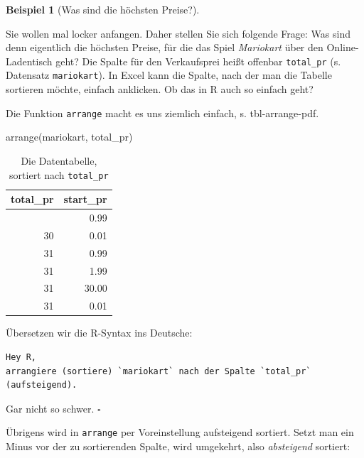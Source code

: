 \documentclass[
  letterpaper,
  twoside,
  open=any]{scrbook}
\newenvironment{Shaded}{\begin{snugshade}}{\end{snugshade}}
\newcommand{\FunctionTok}[1]{\textcolor[rgb]{0.28,0.35,0.67}{#1}}
\newcommand{\NormalTok}[1]{\textcolor[rgb]{0.00,0.23,0.31}{#1}}
\theoremstyle{definition}
\theoremstyle{definition}
\newtheorem{example}{Beispiel}[chapter]
\theoremstyle{definition}
\theoremstyle{remark}
\begin{document}
\begin{example}[Was sind die höchsten
Preise?]\protect\hypertarget{exm-arrange1}{}\label{exm-arrange1}

Sie wollen mal locker anfangen. Daher stellen Sie sich folgende Frage:
Was sind denn eigentlich die höchsten Preise, für die das Spiel
\emph{Mariokart} über den Online-Ladentisch geht? Die Spalte für den
Verkaufsprei heißt offenbar \texttt{total\_pr} (s. Datensatz
\texttt{mariokart}). In Excel kann die Spalte, nach der man die Tabelle
sortieren möchte, einfach anklicken. Ob das in R auch so einfach geht?

Die Funktion \texttt{arrange} macht es uns ziemlich einfach, s.
tbl-arrange-pdf.

\begin{Shaded}
\begin{Highlighting}[]
\FunctionTok{arrange}\NormalTok{(mariokart, total\_pr) }
\end{Highlighting}
\end{Shaded}

\begin{longtable}[]{@{}rr@{}}

\caption{\label{tbl-arrange-pdf}Die Datentabelle, sortiert nach
\texttt{total\_pr}}

\tabularnewline

\toprule\noalign{}
total\_pr & start\_pr \\
\midrule\noalign{}
\endhead
\bottomrule\noalign{}
\endlastfoot
29 & 0.99 \\
30 & 0.01 \\
31 & 0.99 \\
31 & 1.99 \\
31 & 30.00 \\
31 & 0.01 \\

\end{longtable}

Übersetzen wir die R-Syntax ins Deutsche:

\begin{verbatim}
Hey R,
arrangiere (sortiere) `mariokart` nach der Spalte `total_pr` (aufsteigend).
\end{verbatim}

Gar nicht so schwer. \(\square\)

\end{example}

Übrigens wird in \texttt{arrange} per Voreinstellung aufsteigend
sortiert. Setzt man ein Minus vor der zu sortierenden Spalte, wird
umgekehrt, also \emph{absteigend} sortiert:
\end{document}
